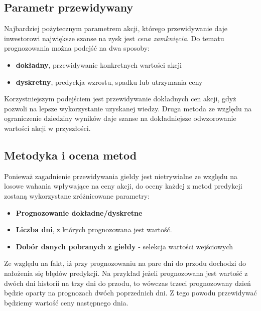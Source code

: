 \documentclass[a4paper, twoside, 11pt, openright]{article}
\begin{document}
\subsection{Parametr przewidywany}

Najbardziej pożytecznym parametrem akcji, którego przewidywanie daje inwestorowi największe szanse na zysk jest \textit{cena zamknięcia}. Do tematu prognozowania można podejść na dwa sposoby:
\begin{itemize}
\item{\textbf{dokładny}, przewidywanie konkretnych wartości akcji}
\item{\textbf{dyskretny}, predyckja wzrostu, spadku lub utrzymania ceny}
\end{itemize}

Korzystniejszym podejściem jest przewidywanie dokładnych cen akcji, gdyż pozwoli na lepsze wykorzystanie uzyskanej wiedzy. Druga metoda ze względu na ograniczenie dziedziny wyników daje szanse na dokładniejsze odwzorowanie wartości akcji w przyszłości.

\subsection{Metodyka i ocena metod}

Ponieważ zagadnienie przewidywania giełdy jest nietrywialne ze względu na losowe wahania wpływające na ceny akcji, do oceny każdej z metod predykcji zostaną wykorzystane zróżnicowane parametry:
	
\begin{itemize}
\item{\textbf{Prognozowanie dokładne/dyskretne} }
\item{\textbf{Liczba dni}, z których prognozowana jest wartość.}
\item{\textbf{Dobór danych pobranych z giełdy} - selekcja wartości wejściowych}

\end{itemize}

Ze względu na fakt, iż przy prognozowaniu na pare dni do przodu dochodzi do nałożenia się błędów predykcji. Na przykład jeżeli prognozowana jest wartość z dwóch dni historii na trzy dni do przodu, to wówczas trzeci prognozowany dzień będzie oparty na prognozach dwóch poprzednich dni. Z tego powodu przewidywać będziemy wartość ceny następnego dnia.



\end{document}
